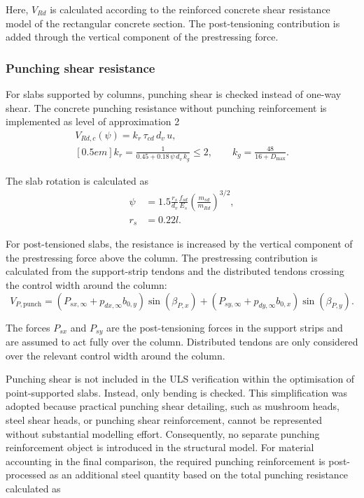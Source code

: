 Here, \(V_{Rd}\) is calculated according to the reinforced concrete shear resistance model of the rectangular concrete section. The post-tensioning contribution is added through the vertical component of the prestressing force.

\newpage
\subsubsection{Punching shear resistance}

For slabs supported by columns, punching shear is checked instead of one-way shear. The concrete punching resistance without punching reinforcement is implemented as level of approximation 2\cite{SIA262_2025}
\begin{equation}
\begin{gathered}
V_{Rd,c}(\psi)
=
k_r\,\tau_{cd}\,d_v\,u,
\\ [0.5em]
k_r
=
\frac{1}
{
0.45
+
0.18\,\psi\,d_v\,k_g
}
\leq
2,
\qquad
k_g
=
\frac{48}
{16+D_{\max}}.
\end{gathered}
\end{equation}

The slab rotation is calculated as
\begin{equation}
\begin{aligned}
\psi
&=
1.5
\frac{r_s}{d_v}
\frac{f_{sd}}{E_s}
\left(
\frac{m_{sd}}{m_{Rd}}
\right)^{3/2},\\
r_s &= 0.22l.
\end{aligned}
\end{equation}


For post-tensioned slabs, the resistance is increased by the vertical component of the prestressing force above the column. The prestressing contribution is calculated from the support-strip tendons and the distributed tendons crossing the control width around the column:
\begin{equation}
V_{P,\mathrm{punch}}
=
\left(
P_{sx,\infty}
+
p_{dx,\infty} b_{0,y}
\right)
\sin(\beta_{P,x})
+
\left(
P_{sy,\infty}
+
p_{dy,\infty} b_{0,x}
\right)
\sin(\beta_{P,y}).
\end{equation}

The forces \(P_{sx}\) and \(P_{sy}\) are the post-tensioning forces in the support strips and are assumed to act fully over the column. Distributed tendons are only considered over the relevant control width around the column.

Punching shear is not included in the ULS verification within the optimisation of point-supported slabs. Instead, only bending is checked. This simplification was adopted because practical punching shear detailing, such as mushroom heads, steel shear heads, or punching shear reinforcement, cannot be represented without substantial modelling effort. Consequently, no separate punching reinforcement object is introduced in the structural model. For material accounting in the final comparison, the required punching reinforcement is post-processed as an additional steel quantity based on the total punching resistance calculated as

